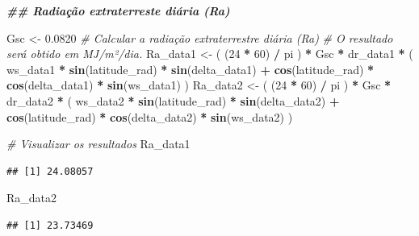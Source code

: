 \documentclass[
]{article}
\newenvironment{Shaded}{\begin{snugshade}}{\end{snugshade}}
\newcommand{\CommentTok}[1]{\textcolor[rgb]{0.56,0.35,0.01}{\textit{#1}}}
\newcommand{\DecValTok}[1]{\textcolor[rgb]{0.00,0.00,0.81}{#1}}
\newcommand{\DocumentationTok}[1]{\textcolor[rgb]{0.56,0.35,0.01}{\textbf{\textit{#1}}}}
\newcommand{\FloatTok}[1]{\textcolor[rgb]{0.00,0.00,0.81}{#1}}
\newcommand{\FunctionTok}[1]{\textcolor[rgb]{0.13,0.29,0.53}{\textbf{#1}}}
\newcommand{\NormalTok}[1]{#1}
\newcommand{\OtherTok}[1]{\textcolor[rgb]{0.56,0.35,0.01}{#1}}
\newcommand{\SpecialCharTok}[1]{\textcolor[rgb]{0.81,0.36,0.00}{\textbf{#1}}}
\begin{document}
\begin{Shaded}
\begin{Highlighting}[]
\DocumentationTok{\#\# Radiação extraterreste diária (Ra)}

\NormalTok{Gsc }\OtherTok{\textless{}{-}} \FloatTok{0.0820}
\CommentTok{\# Calcular a radiação extraterrestre diária (Ra)}
\CommentTok{\# O resultado será obtido em MJ/m²/dia.}
\NormalTok{Ra\_data1 }\OtherTok{\textless{}{-}}\NormalTok{ (}
\NormalTok{  (}\DecValTok{24} \SpecialCharTok{*} \DecValTok{60}\NormalTok{) }\SpecialCharTok{/}\NormalTok{ pi}
\NormalTok{) }\SpecialCharTok{*}\NormalTok{ Gsc }\SpecialCharTok{*}\NormalTok{ dr\_data1 }\SpecialCharTok{*}\NormalTok{ (}
\NormalTok{  ws\_data1 }\SpecialCharTok{*} \FunctionTok{sin}\NormalTok{(latitude\_rad) }\SpecialCharTok{*} \FunctionTok{sin}\NormalTok{(delta\_data1) }\SpecialCharTok{+}
    \FunctionTok{cos}\NormalTok{(latitude\_rad) }\SpecialCharTok{*} \FunctionTok{cos}\NormalTok{(delta\_data1) }\SpecialCharTok{*} \FunctionTok{sin}\NormalTok{(ws\_data1)}
\NormalTok{)}
\NormalTok{Ra\_data2 }\OtherTok{\textless{}{-}}\NormalTok{ (}
\NormalTok{  (}\DecValTok{24} \SpecialCharTok{*} \DecValTok{60}\NormalTok{) }\SpecialCharTok{/}\NormalTok{ pi}
\NormalTok{) }\SpecialCharTok{*}\NormalTok{ Gsc }\SpecialCharTok{*}\NormalTok{ dr\_data2 }\SpecialCharTok{*}\NormalTok{ (}
\NormalTok{  ws\_data2 }\SpecialCharTok{*} \FunctionTok{sin}\NormalTok{(latitude\_rad) }\SpecialCharTok{*} \FunctionTok{sin}\NormalTok{(delta\_data2) }\SpecialCharTok{+}
    \FunctionTok{cos}\NormalTok{(latitude\_rad) }\SpecialCharTok{*} \FunctionTok{cos}\NormalTok{(delta\_data2) }\SpecialCharTok{*} \FunctionTok{sin}\NormalTok{(ws\_data2)}
\NormalTok{)}

\CommentTok{\# Visualizar os resultados}
\NormalTok{Ra\_data1}
\end{Highlighting}
\end{Shaded}

\begin{verbatim}
## [1] 24.08057
\end{verbatim}

\begin{Shaded}
\begin{Highlighting}[]
\NormalTok{Ra\_data2}
\end{Highlighting}
\end{Shaded}

\begin{verbatim}
## [1] 23.73469
\end{verbatim}
\end{document}
